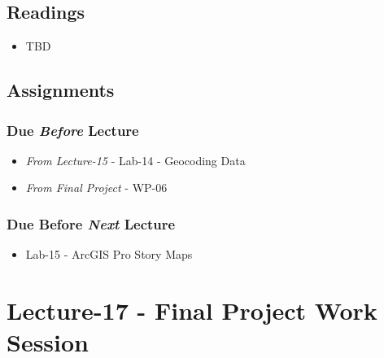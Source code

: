 \documentclass[
]{book}
\providecommand{\tightlist}{%
  \setlength{\itemsep}{0pt}\setlength{\parskip}{0pt}}
\begin{document}
\hypertarget{readings-16}{%
\subsection*{Readings}\label{readings-16}}

\begin{itemize}
\tightlist
\item
  TBD
\end{itemize}

\hypertarget{assignments-17}{%
\subsection*{Assignments}\label{assignments-17}}

\hypertarget{due-before-lecture-15}{%
\subsubsection*{\texorpdfstring{Due \emph{Before} Lecture}{Due Before Lecture}}\label{due-before-lecture-15}}

\begin{itemize}
\tightlist
\item
  \emph{From Lecture-15} - Lab-14 - Geocoding Data
\item
  \emph{From Final Project} - WP-06
\end{itemize}

\hypertarget{due-before-next-lecture-14}{%
\subsubsection*{\texorpdfstring{Due Before \emph{Next} Lecture}{Due Before Next Lecture}}\label{due-before-next-lecture-14}}

\begin{itemize}
\tightlist
\item
  Lab-15 - ArcGIS Pro Story Maps
\end{itemize}

\hypertarget{lecture-17---final-project-work-session}{%
\section*{Lecture-17 - Final Project Work Session}\label{lecture-17---final-project-work-session}}
\end{document}
